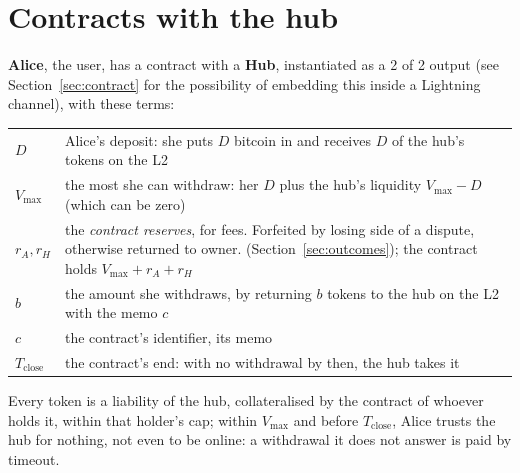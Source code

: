 \documentclass[11pt]{article}
\newcommand{\vmax}{V_{\max}}
\newcommand{\Tc}{T_{\mathrm{close}}}
\begin{document}

\section{Contracts with the hub}
\label{sec:terms}

\textbf{Alice}, the user, has a contract with a \textbf{Hub}, instantiated as a 2 of 2 output  (see Section~\ref{sec:contract} for the possibility of embedding this inside a Lightning channel), with these terms:
\begin{center}
\small
\begin{tabularx}{\linewidth}{p{16mm}L}
\toprule
$D$ & Alice's deposit: she puts $D$ bitcoin in and receives $D$ of the hub's tokens on the L2 \\
$\vmax$ & the most she can withdraw: her $D$ plus the hub's liquidity $\vmax - D$ (which can be zero)\footnotemark\\
$r_A, r_H$ & the \emph{contract reserves}, for fees. Forfeited by losing side of a dispute, otherwise returned to owner. (Section~\ref{sec:outcomes}); the contract holds $\vmax + r_A + r_H$ \\
$b$ & the amount she withdraws, by returning $b$ tokens to the hub on the L2 with the memo $c$ \\
$c$ & the contract's identifier, its memo \\
$\Tc$ & the contract's end: with no withdrawal by then, the hub takes it \\
\bottomrule
\end{tabularx}
\end{center}
Every token is a liability of the hub, collateralised by the contract of whoever holds it, within that holder's cap; within $\vmax$ and before $\Tc$, Alice trusts the hub for nothing, not even to be online: a withdrawal it does not answer is paid by timeout.
\end{document}
